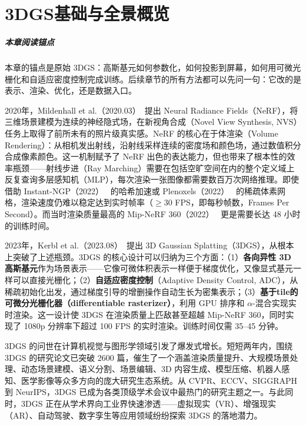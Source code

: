 \chapter{3DGS基础与全景概览}
\label{ch:01}

\paragraph*{本章阅读锚点}
本章的锚点是原始 3DGS：高斯基元如何参数化，如何投影到屏幕，如何用可微光栅化和自适应密度控制完成训练。后续章节的所有方法都可以先问一句：它改的是表示、渲染、优化，还是数据入口。


2020年，Mildenhall et al.（2020.03）~\cite{2003_10204}提出 Neural Radiance Fields（NeRF），将三维场景建模为连续的神经隐式场，在新视角合成（Novel View Synthesis, NVS）任务上取得了前所未有的照片级真实感。NeRF 的核心在于体渲染（Volume Rendering）：从相机发出射线，沿射线采样连续的密度场和颜色场，通过数值积分合成像素颜色。这一机制赋予了 NeRF 出色的表达能力，但也带来了根本性的效率瓶颈——射线步进（Ray Marching）需要在包括空旷空间在内的整个定义域上反复查询多层感知机（MLP），每次渲染一张图像都需要数百万次网络推理。即使借助 Instant-NGP（2022）~\cite{mueller2022instant} 的哈希加速或 Plenoxels（2022）~\cite{plenoxels} 的稀疏体素网格，渲染速度仍难以稳定达到实时帧率（$\geq$30 FPS，即每秒帧数，Frames Per Second）。而当时渲染质量最高的 Mip-NeRF 360（2022）~\cite{barron2022mipnerf360} 更是需要长达 48 小时的训练时间。

2023年，Kerbl et al.（2023.08）~\cite{2308_04079}提出 3D Gaussian Splatting（3DGS），从根本上突破了上述瓶颈。3DGS 的核心设计可以归纳为三个方面：（1）\textbf{各向异性 3D 高斯基元}作为场景表示——它像可微体积表示一样便于梯度优化，又像显式基元一样可以直接光栅化；（2）\textbf{自适应密度控制}（Adaptive Density Control, ADC），从稀疏初始化出发，通过梯度引导的增删操作自动生长为密集表示；（3）\textbf{基于tile的可微分光栅化器（differentiable rasterizer）}，利用 GPU 排序和 $\alpha$-混合实现实时渲染。这一设计使 3DGS 在渲染质量上匹敌甚至超越 Mip-NeRF 360，同时实现了 1080p 分辨率下超过 100 FPS 的实时渲染。训练时间仅需 35--45 分钟。

3DGS 的问世在计算机视觉与图形学领域引发了爆发式增长。短短两年内，围绕 3DGS 的研究论文已突破 2600 篇，催生了一个涵盖渲染质量提升、大规模场景处理、动态场景建模、语义分割、场景编辑、3D 内容生成、模型压缩、机器人感知、医学影像等众多方向的庞大研究生态系统。从 CVPR、ECCV、SIGGRAPH 到 NeurIPS，3DGS 已成为各类顶级学术会议中最热门的研究主题之一。与此同时，3DGS 正在从学术界向工业界快速渗透——虚拟现实（VR）、增强现实（AR）、自动驾驶、数字孪生等应用领域纷纷探索 3DGS 的落地潜力。

